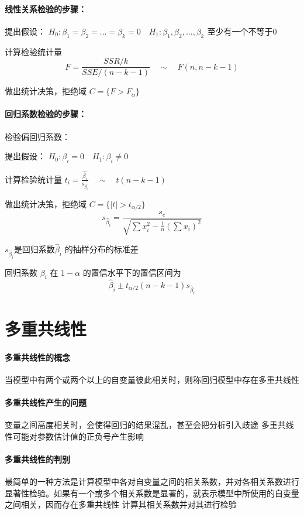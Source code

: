 \documentclass[UTF8,10pt]{book}
\begin{document}
\paragraph{线性关系检验的步骤：}	

提出假设： $ H_0 : \beta_1 = \beta_2 = ... = \beta_k = 0 \quad H_1 : \beta_1 , \beta_2 , ... , \beta_k$ 至少有一个不等于0 

计算检验统计量 
$$ F = \frac{SSR/k}{SSE/(n-k-1)} \quad \sim \quad F(n,n-k-1) $$ 

做出统计决策，拒绝域 $ C = \{ F>F_{\alpha} \} $

\paragraph{回归系数检验的步骤：}	

检验偏回归系数： 

提出假设： $ H_0 : \beta_i = 0 \quad H_1 : \beta_i \neq 0$ 

计算检验统计量 $t_i = \frac{\hat{\beta_i}}{s_{\hat{\beta_i}}} \quad \sim \quad t(n-k-1)$ 

做出统计决策，拒绝域 $ C = \{ |t|>t_{\alpha / 2} \} $ 
$$ s_{\hat{\beta}_i} = \frac{s_e}{\sqrt{\sum x_i^2 - \frac{1}{n}\left(\sum x_i\right)^2}} $$ 

$ s_{\hat{\beta}_i} $是回归系数$\hat{\beta}_i$ 的抽样分布的标准差

回归系数 $\beta_i$ 在 $1-\alpha$ 的置信水平下的置信区间为	
$$ \hat{\beta}_i \pm t_{\alpha /2}(n-k-1)s_{\hat{\beta}_i} $$

\section{多重共线性}
\paragraph{多重共线性的概念}	当模型中有两个或两个以上的自变量彼此相关时，则称回归模型中存在多重共线性

\paragraph{多重共线性产生的问题}	变量之间高度相关时，会使得回归的结果混乱，甚至会把分析引入歧途 多重共线性可能对参数估计值的正负号产生影响

\paragraph{多重共线性的判别}	最简单的一种方法是计算模型中各对自变量之间的相关系数，并对各相关系数进行显著性检验。如果有一个或多个相关系数是显著的，就表示模型中所使用的自变量之间相关，因而存在多重共线性 计算其相关系数并对其进行检验
\end{document}
